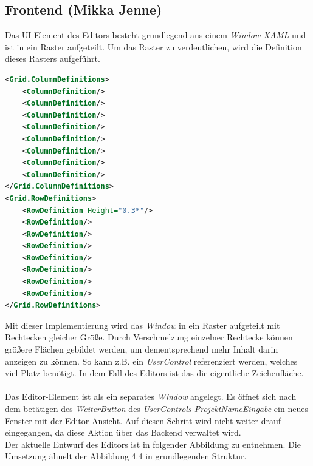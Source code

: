 \subsection{Frontend (Mikka Jenne)}
Das UI-Element des Editors besteht grundlegend aus einem \textit{Window-XAML} und ist in ein Raster aufgeteilt. Um das Raster zu verdeutlichen, wird die Definition dieses Rasters aufgeführt.
\\ 
\begin{lstlisting}[language=XML,
    frame=single,           % Ein Rahmen um den Code
    framexleftmargin=15pt,  % Rahmen link von den Zahlen
    style=algoBericht,
    label={usercontrolsnippet},
    captionpos=b,           % Caption unter den Code setzen
caption={Editor Raster-Layout}]
<Grid.ColumnDefinitions>
    <ColumnDefinition/>
    <ColumnDefinition/>
    <ColumnDefinition/>
    <ColumnDefinition/>
    <ColumnDefinition/>
    <ColumnDefinition/>
    <ColumnDefinition/>
    <ColumnDefinition/>
</Grid.ColumnDefinitions>
<Grid.RowDefinitions>
    <RowDefinition Height="0.3*"/>
    <RowDefinition/>
    <RowDefinition/>
    <RowDefinition/>
    <RowDefinition/>
    <RowDefinition/>
    <RowDefinition/>
    <RowDefinition/>
</Grid.RowDefinitions>
\end{lstlisting}
Mit dieser Implementierung wird das \textit{Window} in ein Raster aufgeteilt mit Rechtecken gleicher Größe. Durch Verschmelzung einzelner Rechtecke können 
größere Flächen gebildet werden, um dementsprechend mehr Inhalt darin anzeigen zu können. So kann z.B. ein \textit{UserControl} referenziert werden,
welches viel Platz benötigt. In dem Fall des Editors ist das die eigentliche Zeichenfläche.
\\ 
\\Das Editor-Element ist als ein separates 
\textit{Window} angelegt. Es öffnet sich nach dem betätigen des \textit{WeiterButton} des \textit{UserControls-ProjektNameEingabe} ein neues Fenster mit der Editor Ansicht. 
Auf diesen Schritt wird nicht weiter drauf eingegangen, da diese Aktion über das Backend verwaltet wird. 
\pagebreak
\\Der aktuelle Entwurf des Editors ist in folgender Abbildung zu entnehmen. Die Umsetzung ähnelt der Abbildung 4.4 in grundlegenden Struktur.
